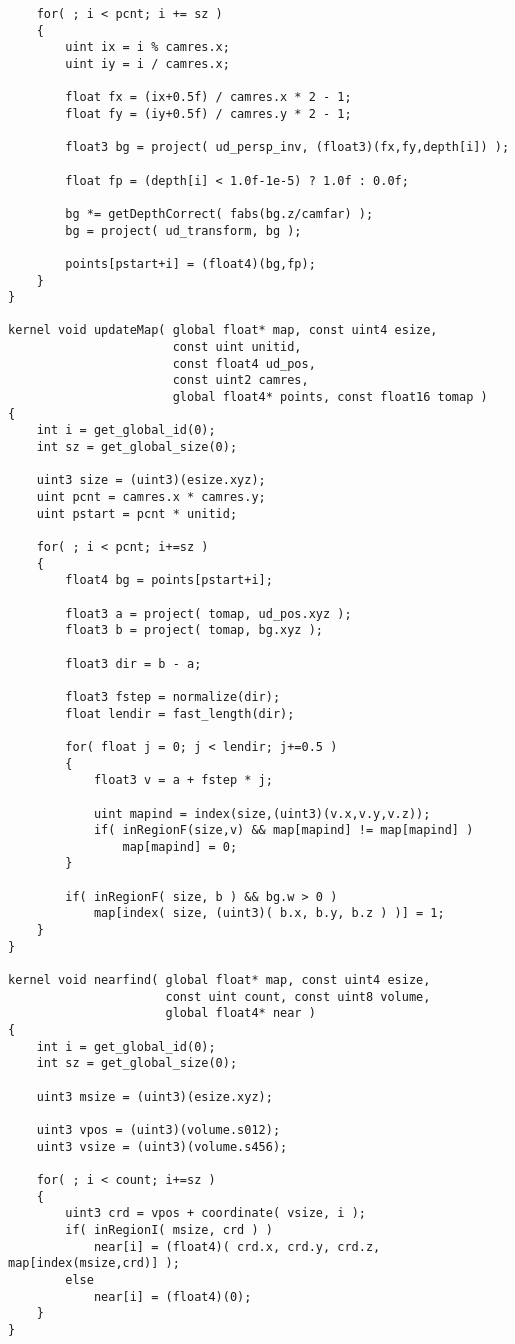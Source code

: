 \begin{verbatim}
    for( ; i < pcnt; i += sz )
    {
        uint ix = i % camres.x;
        uint iy = i / camres.x;

        float fx = (ix+0.5f) / camres.x * 2 - 1;
        float fy = (iy+0.5f) / camres.y * 2 - 1;

        float3 bg = project( ud_persp_inv, (float3)(fx,fy,depth[i]) );

        float fp = (depth[i] < 1.0f-1e-5) ? 1.0f : 0.0f;

        bg *= getDepthCorrect( fabs(bg.z/camfar) );
        bg = project( ud_transform, bg );

        points[pstart+i] = (float4)(bg,fp);
    }
}

kernel void updateMap( global float* map, const uint4 esize,
                       const uint unitid,
                       const float4 ud_pos,
                       const uint2 camres,
                       global float4* points, const float16 tomap )
{
    int i = get_global_id(0);
    int sz = get_global_size(0);

    uint3 size = (uint3)(esize.xyz);
    uint pcnt = camres.x * camres.y;
    uint pstart = pcnt * unitid;

    for( ; i < pcnt; i+=sz )
    {
        float4 bg = points[pstart+i];

        float3 a = project( tomap, ud_pos.xyz );
        float3 b = project( tomap, bg.xyz );

        float3 dir = b - a;

        float3 fstep = normalize(dir);
        float lendir = fast_length(dir);

        for( float j = 0; j < lendir; j+=0.5 )
        {
            float3 v = a + fstep * j;

            uint mapind = index(size,(uint3)(v.x,v.y,v.z));
            if( inRegionF(size,v) && map[mapind] != map[mapind] )
                map[mapind] = 0;
        }

        if( inRegionF( size, b ) && bg.w > 0 )
            map[index( size, (uint3)( b.x, b.y, b.z ) )] = 1;
    }
}

kernel void nearfind( global float* map, const uint4 esize,
                      const uint count, const uint8 volume,
                      global float4* near )
{
    int i = get_global_id(0);
    int sz = get_global_size(0);

    uint3 msize = (uint3)(esize.xyz);

    uint3 vpos = (uint3)(volume.s012);
    uint3 vsize = (uint3)(volume.s456);
    
    for( ; i < count; i+=sz )
    {
        uint3 crd = vpos + coordinate( vsize, i );
        if( inRegionI( msize, crd ) )
            near[i] = (float4)( crd.x, crd.y, crd.z, map[index(msize,crd)] );
        else
            near[i] = (float4)(0);
    }
}
\end{verbatim}

